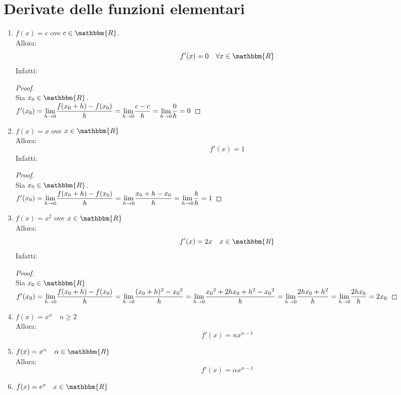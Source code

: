 \documentclass[12pt]{report}
\begin{document}
 	\section{Derivate delle funzioni elementari}
 	\begin{enumerate}[label = (\arabic*)]
 		\item $f(x) = c$ ove $c \in \mathbbm{R}$. \\
 		Allora:
 		\[
 		f'(x) = 0 \quad \forall x \in \mathbbm{R}
 		\]
 		Infatti:
 		\begin{proof} \quad \\
 			Sia $x_0 \in \mathbbm{R}$. \\
 			$f'(x_0) = \mathlarger{\lim_{h \to 0}}\dfrac{f(x_0 + h) - f(x_0)}{h} = \mathlarger{\lim_{h \to 0}}\dfrac{c - c}{h} = \mathlarger{\lim_{h \to 0}}\dfrac{0}{h} = 0$
 		\end{proof}
 		\item $f(x) = x$ ove $x \in \mathbbm{R}$ \\
 		Allora:
 		\[
 		f'(x) = 1
 		\]
 		Infatti:
 		\begin{proof} \quad \\
 			Sia $x_0 \in \mathbbm{R}$. \\
 			$f'(x_0) = \mathlarger{\lim_{h \to 0}}\dfrac{f(x_0 + h) - f(x_0)}{h} = \mathlarger{\lim_{h \to 0}}\dfrac{x_0 + h - x_0}{h} = \mathlarger{\lim_{h \to 0}}\dfrac{h}{h} = 1$
 		\end{proof}
 		\item $f(x) = x^2$ ove $x \in \mathbbm{R}$ \\
 		Allora:
 		\[
 		f'(x) = 2x \quad x \in \mathbbm{R}
 		\]
 		Infatti:
 		\begin{proof} \quad \\
 			Sia $x_0 \in \mathbbm{R}$ \\
 			$f'(x_0) = \mathlarger{\lim_{h \to 0}}\dfrac{f(x_0 + h) - f(x_0)}{h} = \mathlarger{\lim_{h \to 0}}\dfrac{(x_0 + h)^2 - {x_0}^2}{h} = \mathlarger{\lim_{h \to 0}}\dfrac{{x_0}^2 + 2hx_0 + h^2 - {x_0}^2 }{h} = \mathlarger{\lim_{h \to 0}}\dfrac{2hx_0 + h^2}{h} = \mathlarger{\lim_{h \to 0}}\dfrac{2hx_0}{h} = 2x_0$
 		\end{proof}
 		\item $f(x) = x^n \quad n \geq 2$ \\
 		Allora:
 		\[
 		f'(x) = nx^{n - 1}
 		\]
 		\item $f(x) = x^\alpha \quad \alpha \in \mathbbm{R}$ \\
 		Allora:
 		\[
 		f'(x) = \alpha x^{\alpha - 1}
 		\]
 		\item $f(x) = e^x \quad x \in \mathbbm{R}$ \\

\end{enumerate}
\end{document}

